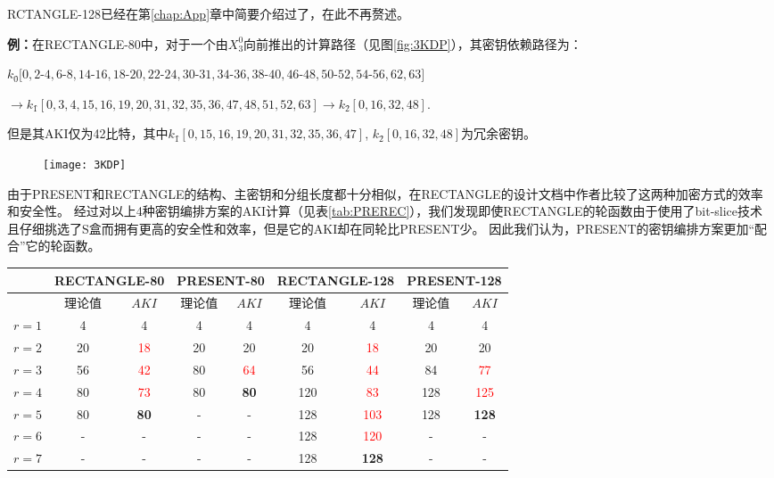 RCTANGLE-128已经在第\ref{chap:App}章中简要介绍过了，在此不再赘述。

\textbf{例：}在RECTANGLE-80中，对于一个由$X_3^0$向前推出的计算路径（见图\ref{fig:3KDP}），其密钥依赖路径为：
\begin{center}
    \noindent
    \footnotesize{$k_0\hat{}[0,2$-$4,6$-$8,14$-$16,18$-$20,22$-$24,30$-$31,34$-$36,38$-$40,46$-$48,50$-$52,54$-$56,62,63]$}

  \noindent
  \centering
  \footnotesize{$\rightarrow k_1\hat{}[0,3,4,15,16,19,20,31,32,35,36,47,48,51,52,63]\rightarrow k_2\hat{}[0,16,32,48]$.}
  \end{center}
但是其AKI仅为42比特，其中$k_1\hat{}[0,15,16,19,20,31,32,35,36,47]$, $k_2\hat{}[0,16,32,48]$为冗余密钥。
\begin{figure}[htbp]
    \centering
    \texttt{[image: 3KDP]}
\end{figure}

由于PRESENT和RECTANGLE的结构、主密钥和分组长度都十分相似，在RECTANGLE的设计文档中作者比较了这两种加密方式的效率和安全性。
经过对以上4种密钥编排方案的AKI计算（见表\ref{tab:PREREC}），我们发现即使RECTANGLE的轮函数由于使用了bit-slice技术且仔细挑选了S盒而拥有更高的安全性和效率，但是它的AKI却在同轮比PRESENT少。
因此我们认为，PRESENT的密钥编排方案更加“配合”它的轮函数。

\begin{table}[tbp]
\centering
\begin{tabular}{c|cc|cc|cc|cc}
\hline
&\multicolumn{2}{c|}{RECTANGLE-80\quad}&\multicolumn{2}{c|}{PRESENT-80}&\multicolumn{2}{c|}{RECTANGLE-128\quad}&\multicolumn{2}{c}{PRESENT-128}\\
\hline
&理论值&\quad $AKI$&理论值&\quad $AKI$&理论值&\quad $AKI$&理论值&\quad $AKI$\\
$r=1$&4&4&4&4&4&4&4&4\\
$r=2$&20 & \textcolor{red}{18}&20 &20&20& \textcolor{red}{18}  &20 &20\\
$r=3$&56 &\textcolor{red}{42} &80 &\textcolor{red}{64}&56 &\textcolor{red}{44}  &84 &\textcolor{red}{77}\\
$r=4$&80 &\textcolor{red}{73} &80 &\textbf{80}&120 &\textcolor{red}{83} &128 &\textcolor{red}{125}\\
$r=5$&80 &\textbf{80}         &-  &-          &128 &\textcolor{red}{103} &128 &\textbf{128}\\
$r=6$&-&-&-&-&128 &\textcolor{red}{120}&- &-\\
$r=7$&-&-&-&-&128 &\textbf{128} &- &-\\
\hline
\end{tabular}
\end{table}

